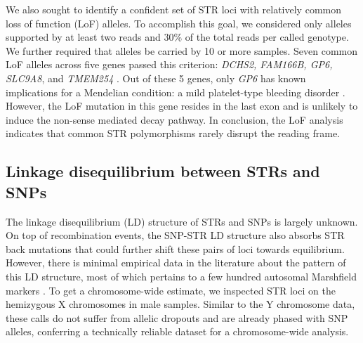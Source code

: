 We also sought to identify a confident set of STR loci with relatively common loss of function (LoF) alleles. To accomplish this goal, we considered only alleles supported by at least two reads and 30\% of the total reads per called genotype. We further required that alleles be carried by 10 or more samples. Seven common LoF alleles across five genes passed this criterion: \emph{DCHS2, FAM166B, GP6, SLC9A8}, and \emph{TMEM254} \cite{SuppWillemsGymrekHighnamEtAl2014}. Out of these 5 genes, only \emph{GP6} has known implications for a Mendelian condition: a mild platelet-type bleeding disorder \cite{DumontLasneRothschildEtAl2009,HermansWittevrongelThysEtAl2009}. However, the LoF mutation in this gene resides in the last exon and is unlikely to induce the non-sense mediated decay pathway. In conclusion, the LoF analysis indicates that common STR polymorphisms rarely disrupt the reading frame.  

\subsection{Linkage disequilibrium between STRs and SNPs}
The linkage disequilibrium (LD) structure of STRs and SNPs is largely unknown. On top of recombination events, the SNP-STR LD structure also absorbs STR back mutations that could further shift these pairs of loci towards equilibrium. However, there is minimal empirical data in the literature about the pattern of this LD structure, most of which pertains to a few hundred autosomal Marshfield markers \cite{PayseurPlaceWeber2008}. To get a chromosome-wide estimate, we inspected STR loci on the hemizygous X chromosomes in male samples. Similar to the Y chromosome data, these calls do not suffer from allelic dropouts and are already phased with SNP alleles, conferring a technically reliable dataset for a chromosome-wide analysis.  

